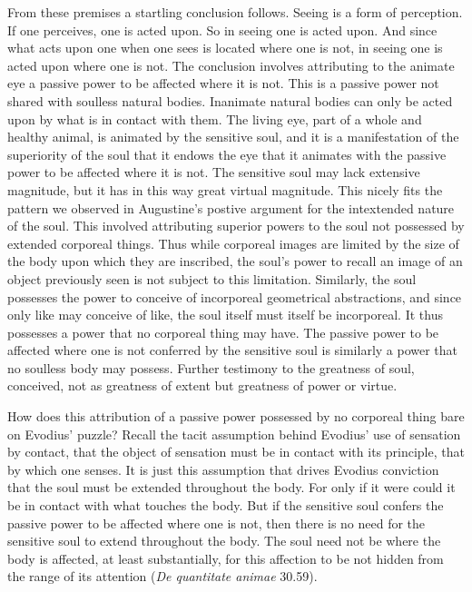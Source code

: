 \documentclass[12pt]{article}
\begin{document}
From these premises a startling conclusion follows. Seeing is a form of perception. If one perceives, one is acted upon. So in seeing one is acted upon. And since what acts upon one when one sees is located where one is not, in seeing one is acted upon where one is not. The conclusion involves attributing to the animate eye a passive power to be affected where it is not. This is a passive power not shared with soulless natural bodies. Inanimate natural bodies can only be acted upon by what is in contact with them. The living eye, part of a whole and healthy animal, is animated by the sensitive soul, and it is a manifestation of the superiority of the soul that it endows the eye that it animates with the passive power to be affected where it is not. The sensitive soul may lack extensive magnitude, but it has in this way great virtual magnitude. This nicely fits the pattern we observed in Augustine's postive argument for the intextended nature of the soul. This involved attributing superior powers to the soul not possessed by extended corporeal things. Thus while corporeal images are limited by the size of the body upon which they are inscribed, the soul's power to recall an image of an object previously seen is not subject to this limitation. Similarly, the soul possesses the power to conceive of incorporeal geometrical abstractions, and since only like may conceive of like, the soul itself must itself be incorporeal. It thus possesses a power that no corporeal thing may have. The passive power to be affected where one is not conferred by the sensitive soul is similarly a power that no soulless body may possess. Further testimony to the greatness of soul, conceived, not as greatness of extent but greatness of power or virtue.

How does this attribution of a passive power possessed by no corporeal thing bare on Evodius' puzzle? Recall the tacit assumption behind Evodius' use of sensation by contact, that the object of sensation must be in contact with its principle, that by which one senses. It is just this assumption that drives Evodius conviction that the soul must be extended throughout the body. For only if it were could it be in contact with what touches the body. But if the sensitive soul confers the passive power to be affected where one is not, then there is no need for the sensitive soul to extend throughout the body. The soul need not be where the body is affected, at least substantially, for this affection to be not hidden from the range of its attention (\emph{De quantitate animae} 30.59). 
\end{document}
